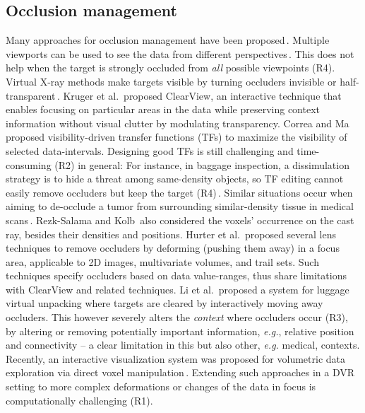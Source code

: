 \subsection{Occlusion management}
%
Many approaches for occlusion management have been proposed\,\cite{4483791}. Multiple viewports can be used to see the data from different perspectives\,\cite{WangBaldonado:2000:GUM:345513.345271}. This does not help when the target is strongly occluded from \emph{all} possible viewpoints (R4). Virtual X-ray methods make targets visible by turning occluders invisible or half-transparent\,\cite{Burns:2008:ACC:1457515.1409107}. Kruger et al.\,\cite{4015450} proposed ClearView, an interactive technique that enables focusing on particular areas in the data while preserving context information without visual clutter by modulating transparency. Correa and Ma\,\cite{5416704} proposed visibility-driven transfer functions (TFs) to maximize the visibility of selected data-intervals. Designing good TFs is still challenging and time-consuming (R2) in general: For instance, in baggage inspection, a dissimulation strategy is to hide a threat among same-density objects, so TF editing cannot easily remove occluders but keep the target (R4)\,\cite{7819413}. Similar situations occur when aiming to de-occlude a tumor from surrounding similar-density tissue in medical scans\,\cite{CGF:CGF12927}. 
Rezk-Salama and Kolb\,\cite{CGF:CGF979} also considered the voxels' occurrence on the cast ray, besides their densities and positions. Hurter et al.\,\cite{moleview,6787171} proposed several lens techniques to remove occluders by deforming (pushing them away) in a focus area, applicable to 2D images, multivariate volumes, and trail sets. Such techniques specify occluders based on data value-ranges, thus share limitations with ClearView and related techniques. Li et al.\,\cite{Li:2012:LVV:2425296.2425325} proposed a system for luggage virtual unpacking where targets are cleared by interactively moving away occluders. This however severely alters the \emph{context} where occluders occur (R3), by altering or removing potentially important information, \emph{e.g.}, relative position and connectivity -- a clear limitation in this but also other, \emph{e.g.} medical, contexts. Recently, an interactive visualization system was proposed for volumetric data exploration via direct voxel manipulation\,\cite{7819413}. Extending such approaches in a DVR setting to more complex deformations or changes of the data in focus is computationally challenging (R1).

\vspace{-0.15cm}
